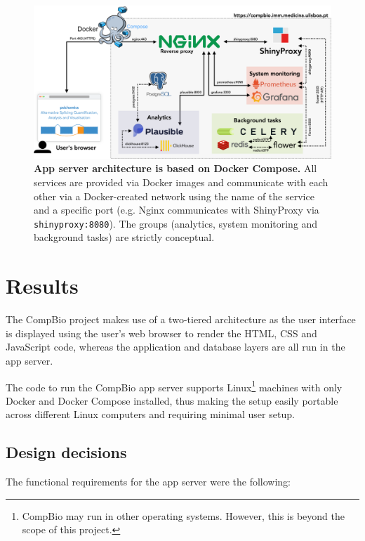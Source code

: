 \begin{figure}[!t]
  \includegraphics[width=.9\textwidth]{images/app-server/architecture}
  \centering
  \caption[App server architecture]{\textbf{App server architecture is based on Docker Compose.} All services are provided via Docker images and communicate with each other via a Docker-created network using the name of the service and a specific port (e.g. Nginx communicates with ShinyProxy via \texttt{shinyproxy:8080}). The groups  (analytics, system monitoring and background tasks) are strictly conceptual.}
  \label{fig:architecture}
\end{figure}

\section{Results}

The CompBio project makes use of a two-tiered architecture as the user interface is displayed using the user's web browser to render the HTML, CSS and JavaScript code, whereas the application and database layers are all run in the app server. %

The code to run the CompBio app server supports Linux\footnote{CompBio may run in other operating systems. However, this is beyond the scope of this project.} machines with only Docker and Docker Compose installed, thus making the setup easily portable across different Linux computers and requiring minimal user setup.

\subsection{Design decisions}

The functional requirements for the app server were the following:


